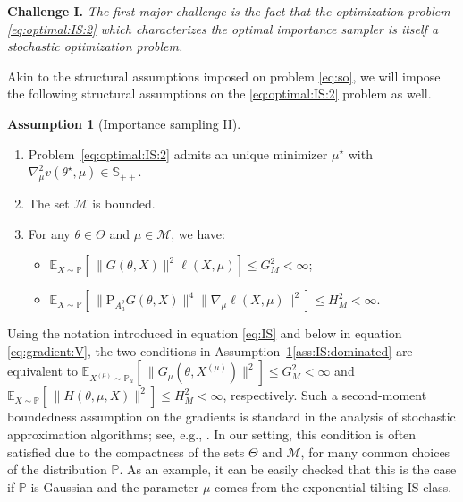 \documentclass[11pt,a4paper]{article}
\theoremstyle{definition}
\newtheorem{assumption}[theorem]{Assumption}
\newcommand{\mb}{\mathbb}
\begin{document}
\medskip
\noindent\textbf{Challenge I.} \emph{The first major challenge is the fact that the optimization problem \eqref{eq:optimal:IS:2} which characterizes the optimal importance sampler is itself a stochastic optimization problem.}

\medskip
Akin to the structural assumptions imposed on problem \eqref{eq:so}, we will impose the following structural assumptions on the \eqref{eq:optimal:IS:2} problem as well.

\begin{assumption}[Importance sampling II]~
\label{assump:IS}
\begin{enumerate}[label=(\roman*)]
    \item \label{ass:IS:unique} Problem~\eqref{eq:optimal:IS:2} admits an unique minimizer $\mu^\star$ with $\nabla^2_\mu v(\theta^\star,\mu)\in \mb S_{++}$.
    
    \item The set $\mathcal M$ is bounded.
    
    \item \label{ass:IS:dominated} For any $\theta \in \Theta$ and $\mu \in \mathcal M$, we have:
    \begin{itemize}
        \item[(iii.1)] \label{ass:IS:dominated:1} $\mathbb E_{X \sim \mathbb P}\left[\,\|G(\theta,X)\|^2\ell(X,\mu)\right] \leq G^2_M < \infty$;

        \item[(iii.2)] \label{ass:IS:dominated:2} $\mathbb E_{X \sim \mathbb P}\left[\,\|\text{P}_{A_{a}^\theta} G(\theta,X)\|^4\|\nabla_\mu \ell(X,\mu)\|^2\right] \leq H^2_M < \infty$.
    \end{itemize}
\end{enumerate}
\end{assumption}

Using the notation introduced in equation \eqref{eq:IS} and below in equation \eqref{eq:gradient:V}, the two conditions in Assumption~\ref{assump:IS}\ref{ass:IS:dominated} are equivalent to $\mathbb E_{X^{(\mu)} \sim \mathbb P_\mu}\left[\,\|G_\mu(\theta,X^{(\mu)})\|^2\right] \leq G^2_M < \infty$ and $\mathbb E_{X \sim \mathbb P}\left[\,\|H(\theta, \mu, X)\|^2\right] \leq H^2_M < \infty$, respectively. Such a second-moment boundedness assumption on the gradients is standard in the analysis of stochastic approximation algorithms; see, e.g., \cite{nemirovski2009robust}. In our setting, this condition is often satisfied due to the compactness of the sets $\Theta$ and $\mathcal M$, for many common choices of the distribution $\mathbb P$. As an example, it can be easily checked that this is the case if $\mathbb P$ is Gaussian and the parameter $\mu$ comes from the exponential tilting IS class.
\end{document}
